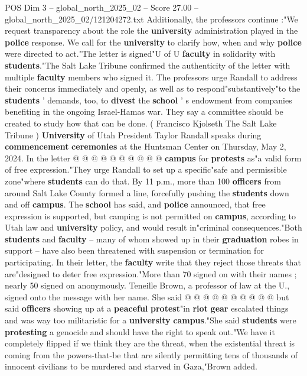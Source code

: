 \begin{textsample}{POS Dim 3 – global\_north\_2025\_02 – Score 27.00 – global\_north\_2025\_02/121204272.txt}
Additionally, the professors continue :"We request transparency about the role the \textbf{university} administration played in the \textbf{police} response.
We call for the \textbf{university} to clarify how, when and why \textbf{police} were directed to act."The letter is signed"U of U \textbf{faculty} in solidarity with \textbf{students}."The Salt Lake Tribune confirmed the authenticity of the letter with multiple \textbf{faculty} members who signed it.
The professors urge Randall to address their concerns immediately and openly, as well as to respond"substantively"to the \textbf{students} ' demands, too, to \textbf{divest} the \textbf{school} ' s endowment from companies benefiting in the ongoing Israel-Hamas war.
They say a committee should be created to study how that can be done. ( Francisco Kjolseth The Salt Lake Tribune ) \textbf{University} of Utah President Taylor Randall speaks during \textbf{commencement} \textbf{ceremonies} at the Huntsman Center on Thursday, May 2, 2024.
In the letter @ @ @ @ @ @ @ @ @ @ \textbf{campus} for \textbf{protests} as"a valid form of free expression."They urge Randall to set up a specific"safe and permissible zone"where \textbf{students} can do that.
By 11 p.m., more than 100 \textbf{officers} from around Salt Lake County formed a line, forcefully pushing the \textbf{students} down and off \textbf{campus}.
The \textbf{school} has said, and \textbf{police} announced, that free expression is supported, but camping is not permitted on \textbf{campus}, according to Utah law and \textbf{university} policy, and would result in"criminal consequences."Both \textbf{students} and \textbf{faculty} -- many of whom showed up in their \textbf{graduation} robes in support -- have also been threatened with suspension or termination for participating.
In their letter, the \textbf{faculty} write that they reject those threats that are"designed to deter free expression."More than 70 signed on with their names ; nearly 50 signed on anonymously.
Teneille Brown, a professor of law at the U., signed onto the message with her name.
She said @ @ @ @ @ @ @ @ @ @ but said \textbf{officers} showing up at a \textbf{peaceful} \textbf{protest}"in \textbf{riot} \textbf{gear} escalated things and was way too militaristic for a \textbf{university} \textbf{campus}."She said \textbf{students} were \textbf{protesting} a genocide and should have the right to speak out."We have it completely flipped if we think they are the threat, when the existential threat is coming from the powers-that-be that are silently permitting tens of thousands of innocent civilians to be murdered and starved in Gaza,"Brown added.

\end{textsample}
